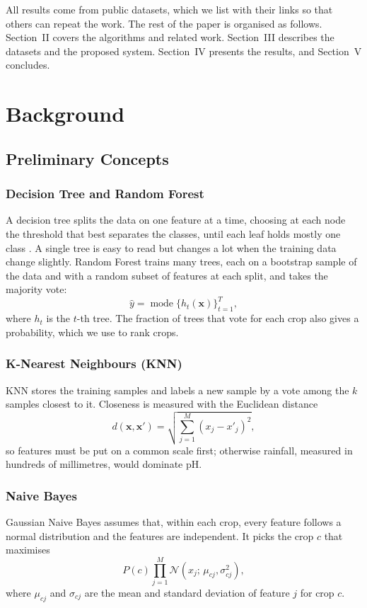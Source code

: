 \documentclass[conference]{IEEEtran}
\begin{document}
All results come from public datasets, which we list with their links so that others can repeat the work. The rest of the paper is organised as follows. Section~II covers the algorithms and related work. Section~III describes the datasets and the proposed system. Section~IV presents the results, and Section~V concludes.

\section{Background}

\subsection{Preliminary Concepts}

\subsubsection{Decision Tree and Random Forest}
A decision tree splits the data on one feature at a time, choosing at each node the threshold that best separates the classes, until each leaf holds mostly one class \cite{quinlan1986}. A single tree is easy to read but changes a lot when the training data change slightly. Random Forest \cite{breiman2001} trains many trees, each on a bootstrap sample of the data and with a random subset of features at each split, and takes the majority vote:
\begin{equation}
\hat{y} = \operatorname{mode}\{h_t(\mathbf{x})\}_{t=1}^{T},
\end{equation}
where $h_t$ is the $t$-th tree. The fraction of trees that vote for each crop also gives a probability, which we use to rank crops.

\subsubsection{K-Nearest Neighbours (KNN)}
KNN \cite{cover1967} stores the training samples and labels a new sample by a vote among the $k$ samples closest to it. Closeness is measured with the Euclidean distance
\begin{equation}
d(\mathbf{x}, \mathbf{x}') = \sqrt{\sum_{j=1}^{M} (x_j - x'_j)^2},
\end{equation}
so features must be put on a common scale first; otherwise rainfall, measured in hundreds of millimetres, would dominate pH.

\subsubsection{Naive Bayes}
Gaussian Naive Bayes assumes that, within each crop, every feature follows a normal distribution and the features are independent. It picks the crop $c$ that maximises
\begin{equation}
P(c)\prod_{j=1}^{M} \mathcal{N}\!\left(x_j;\, \mu_{cj}, \sigma_{cj}^2\right),
\end{equation}
where $\mu_{cj}$ and $\sigma_{cj}$ are the mean and standard deviation of feature $j$ for crop $c$.
\end{document}

